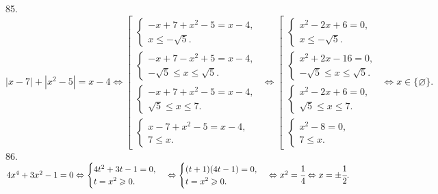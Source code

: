 \documentclass[12pt]{article}
\begin{document}
85. $|x-7|+|x^2-5|=x-4\Leftrightarrow \left[\begin{array}{l}\begin{cases} -x+7+x^2-5=x-4,\\ x\leqslant -\sqrt{5}.\end{cases}\\
\begin{cases} -x+7-x^2+5=x-4,\\ -\sqrt{5}\leqslant x\leqslant \sqrt{5}.\end{cases}\\ \begin{cases} -x+7+x^2-5=x-4,\\ \sqrt{5}\leqslant x\leqslant7.\end{cases}\\
\begin{cases} x-7+x^2-5=x-4,\\ 7 \leqslant x.\end{cases}
\end{array}\right.\Leftrightarrow
\left[\begin{array}{l}\begin{cases} x^2-2x+6=0,\\ x\leqslant -\sqrt{5}.\end{cases}\\
\begin{cases} x^2+2x-16=0,\\ -\sqrt{5}\leqslant x\leqslant \sqrt{5}.\end{cases}\\ \begin{cases} x^2-2x+6=0,\\ \sqrt{5}\leqslant x\leqslant7.\end{cases}\\
\begin{cases} x^2-8=0,\\ 7 \leqslant x.\end{cases}
\end{array}\right.\Leftrightarrow x\in\{\varnothing\}.$\\
86. $4x^4+3x^2-1=0\Leftrightarrow\begin{cases}4t^2+3t-1=0,\\ t=x^2\geqslant0.\end{cases}\Leftrightarrow\begin{cases}(t+1)(4t-1)=0,\\ t=x^2\geqslant0.\end{cases}
\Leftrightarrow x^2=\cfrac{1}{4} \Leftrightarrow x=\pm\cfrac{1}{2}.$\\
\end{document}
